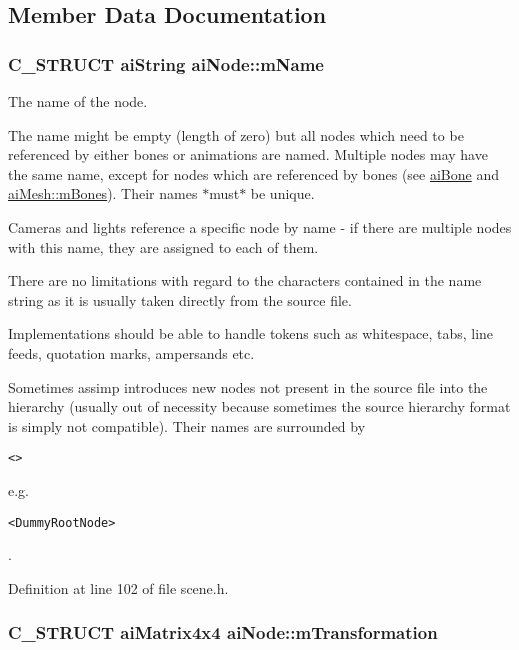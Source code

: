 \subsection{Member Data Documentation}
\hypertarget{structai_node_fa528a7e43e15d92a920229b1ff094f6}{
\subsubsection[mName]{\setlength{\rightskip}{0pt plus 5cm}C\_\-STRUCT {\bf aiString} {\bf aiNode::mName}}}
\label{structai_node_fa528a7e43e15d92a920229b1ff094f6}


The name of the node.

The name might be empty (length of zero) but all nodes which need to be referenced by either bones or animations are named. Multiple nodes may have the same name, except for nodes which are referenced by bones (see \hyperlink{structai_bone}{aiBone} and \hyperlink{structai_mesh_0c0582a7f45b340b6a33552c53232539}{aiMesh::mBones}). Their names $\ast$must$\ast$ be unique.

Cameras and lights reference a specific node by name - if there are multiple nodes with this name, they are assigned to each of them. \par
 There are no limitations with regard to the characters contained in the name string as it is usually taken directly from the source file.

Implementations should be able to handle tokens such as whitespace, tabs, line feeds, quotation marks, ampersands etc.

Sometimes assimp introduces new nodes not present in the source file into the hierarchy (usually out of necessity because sometimes the source hierarchy format is simply not compatible). Their names are surrounded by 

\footnotesize\begin{verbatim}<> \end{verbatim}
\normalsize
 e.g. 

\footnotesize\begin{verbatim}<DummyRootNode> \end{verbatim}
\normalsize
. 

Definition at line 102 of file scene.h.\hypertarget{structai_node_adb69c766c7658bba9d2195af16d6831}{
\subsubsection[mTransformation]{\setlength{\rightskip}{0pt plus 5cm}C\_\-STRUCT aiMatrix4x4 {\bf aiNode::mTransformation}}}
\label{structai_node_adb69c766c7658bba9d2195af16d6831}


